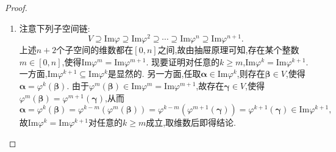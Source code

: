 \documentclass[../../main.tex]{subfiles}%
\begin{document}
\begin{proof}
\begin{enumerate}[(1)]
{\color{blue}证法二(几何方法):} 令\(\varphi\)为在\(n\)维列向量空间上由矩阵\(\boldsymbol{A}\)乘法诱导的线性变换,则\(\varphi\)在标准基下的表示矩阵就是\(\boldsymbol{A}\),并且不难发现对\(\forall k\in \mathbb{N}\),\(\varphi^k\)在标准基下的表示矩阵是\(\boldsymbol{A}^k\).因此\(\mathrm{r}(\boldsymbol{A}^k) = \mathrm{dim} \,\mathrm{Im}\varphi^k\),故原命题等价于$\mathrm{dim}\,\mathrm{Im}\varphi ^n=\mathrm{dim}\,\mathrm{Im}\varphi ^{n+1}=\mathrm{dim}\,\mathrm{Im}\varphi ^{n+2}=\cdots 
$.注意下列子空间链:
\[
V\supseteq\text{Im}\varphi\supseteq\text{Im}\varphi^2\supseteq\cdots\supseteq\text{Im}\varphi^n\supseteq\text{Im}\varphi^{n + 1}.
\]
上述\(n + 2\)个子空间的维数都在\([0,n]\)之间,故由抽屉原理可知,存在某个整数\(m\in[0,n]\),使得\(\text{Im}\varphi^m=\text{Im}\varphi^{m + 1}\). 现要证明对任意的\(k\geqslant  m\),\(\text{Im}\varphi^k=\text{Im}\varphi^{k + 1}\). 一方面,\(\text{Im}\varphi^{k + 1}\subseteq\text{Im}\varphi^k\)是显然的. 另一方面,任取\(\boldsymbol{\alpha}\in\text{Im}\varphi^k\),则存在\(\boldsymbol{\beta}\in V\),使得\(\boldsymbol{\alpha}=\varphi^k(\boldsymbol{\beta})\). 由于\(\varphi^m(\boldsymbol{\beta})\in\text{Im}\varphi^m=\text{Im}\varphi^{m + 1}\),故存在\(\boldsymbol{\gamma}\in V\),使得\(\varphi^m(\boldsymbol{\beta})=\varphi^{m + 1}(\boldsymbol{\gamma})\),从而
\[
\boldsymbol{\alpha}=\varphi^k(\boldsymbol{\beta})=\varphi^{k - m}(\varphi^m(\boldsymbol{\beta}))=\varphi^{k - m}(\varphi^{m + 1}(\boldsymbol{\gamma}))=\varphi^{k + 1}(\boldsymbol{\gamma})\in\text{Im}\varphi^{k + 1},
\]
故\(\text{Im}\varphi^k=\text{Im}\varphi^{k + 1}\)对任意的\(k\geqslant  m\)成立,取维数后即得结论. 

\item 注意下列子空间链:
\[
V\supseteq\text{Im}\varphi\supseteq\text{Im}\varphi^2\supseteq\cdots\supseteq\text{Im}\varphi^n\supseteq\text{Im}\varphi^{n + 1}.
\]
上述\(n + 2\)个子空间的维数都在\([0,n]\)之间,故由抽屉原理可知,存在某个整数\(m\in[0,n]\),使得\(\text{Im}\varphi^m=\text{Im}\varphi^{m + 1}\). 现要证明对任意的\(k\geqslant  m\),\(\text{Im}\varphi^k=\text{Im}\varphi^{k + 1}\). 一方面,\(\text{Im}\varphi^{k + 1}\subseteq\text{Im}\varphi^k\)是显然的. 另一方面,任取\(\boldsymbol{\alpha}\in\text{Im}\varphi^k\),则存在\(\boldsymbol{\beta}\in V\),使得\(\boldsymbol{\alpha}=\varphi^k(\boldsymbol{\beta})\). 由于\(\varphi^m(\boldsymbol{\beta})\in\text{Im}\varphi^m=\text{Im}\varphi^{m + 1}\),故存在\(\boldsymbol{\gamma}\in V\),使得\(\varphi^m(\boldsymbol{\beta})=\varphi^{m + 1}(\boldsymbol{\gamma})\),从而
\[
\boldsymbol{\alpha}=\varphi^k(\boldsymbol{\beta})=\varphi^{k - m}(\varphi^m(\boldsymbol{\beta}))=\varphi^{k - m}(\varphi^{m + 1}(\boldsymbol{\gamma}))=\varphi^{k + 1}(\boldsymbol{\gamma})\in\text{Im}\varphi^{k + 1},
\]
故\(\text{Im}\varphi^k=\text{Im}\varphi^{k + 1}\)对任意的\(k\geqslant  m\)成立,取维数后即得结论. 
\end{enumerate}

\end{proof}
\end{document}
